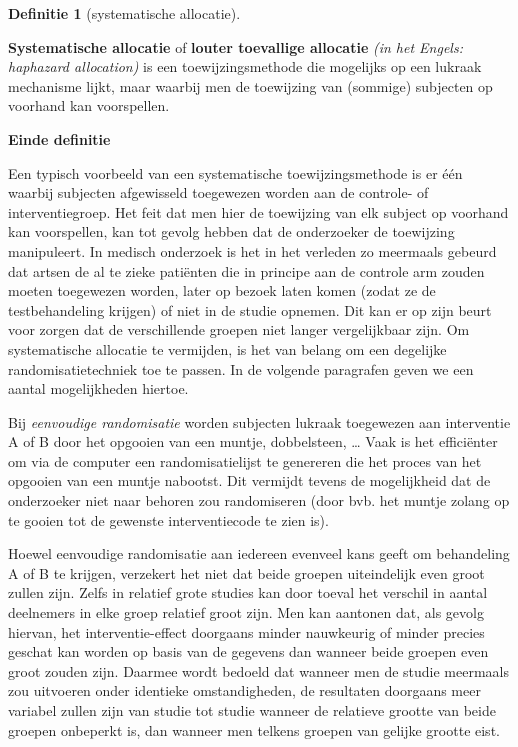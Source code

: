 \documentclass[
  12pt,dutch,coursenotes]{book}
\theoremstyle{definition}
\newtheorem{definition}{Definitie}[chapter]
\theoremstyle{definition}
\theoremstyle{definition}
\theoremstyle{definition}
\theoremstyle{remark}
\begin{document}
\begin{definition}[systematische allocatie]
\protect\hypertarget{def:unnamed-chunk-70}{}{\label{def:unnamed-chunk-70} {} }
\end{definition}
\textbf{Systematische allocatie} of \textbf{louter toevallige allocatie}
\emph{(in het Engels: haphazard allocation)} is een toewijzingsmethode die
mogelijks op een lukraak mechanisme lijkt, maar waarbij men de toewijzing
van (sommige) subjecten op voorhand kan voorspellen.

\textbf{Einde definitie}

Een typisch voorbeeld van een systematische toewijzingsmethode is er één
waarbij subjecten afgewisseld toegewezen worden aan de controle- of
interventiegroep. Het feit dat men hier de toewijzing van elk subject op voorhand kan
voorspellen, kan tot gevolg hebben dat de onderzoeker de toewijzing
manipuleert. In medisch onderzoek is het in het verleden zo meermaals gebeurd dat artsen de al te zieke patiënten die in principe aan de
controle arm zouden moeten toegewezen worden, later op bezoek laten komen
(zodat ze de testbehandeling krijgen) of niet in de studie opnemen. Dit
kan er op zijn beurt voor zorgen dat de verschillende groepen niet langer
vergelijkbaar zijn. Om systematische allocatie te vermijden, is het van
belang om een degelijke randomisatietechniek toe te passen. In de volgende
paragrafen geven we een aantal mogelijkheden hiertoe.

Bij \emph{eenvoudige randomisatie} worden subjecten lukraak toegewezen
aan interventie A of B door het opgooien van een muntje, dobbelsteen, \ldots{}
Vaak is het efficiënter om via de computer een randomisatielijst te
genereren die het proces van het opgooien van een muntje nabootst. Dit
vermijdt tevens de mogelijkheid dat de onderzoeker niet naar behoren zou
randomiseren (door bvb. het muntje zolang op te gooien tot de gewenste
interventiecode te zien is).

Hoewel eenvoudige randomisatie aan iedereen evenveel kans geeft om
behandeling A of B te krijgen, verzekert het niet dat beide groepen
uiteindelijk even groot zullen zijn. Zelfs in relatief grote studies kan
door toeval het verschil in aantal deelnemers in elke groep relatief groot
zijn. Men kan aantonen dat, als gevolg hiervan, het interventie-effect
doorgaans minder nauwkeurig of minder precies geschat kan worden op basis
van de gegevens dan wanneer beide groepen even groot zouden zijn. Daarmee
wordt bedoeld dat wanneer men de studie meermaals zou uitvoeren onder
identieke omstandigheden, de resultaten doorgaans meer variabel zullen zijn
van studie tot studie wanneer de relatieve grootte van beide groepen onbeperkt
is, dan wanneer men telkens groepen van gelijke grootte eist.
\end{document}
